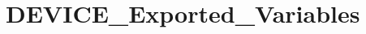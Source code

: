 \hypertarget{group___d_e_v_i_c_e___exported___variables}{}\section{D\+E\+V\+I\+C\+E\+\_\+\+Exported\+\_\+\+Variables}
\label{group___d_e_v_i_c_e___exported___variables}
